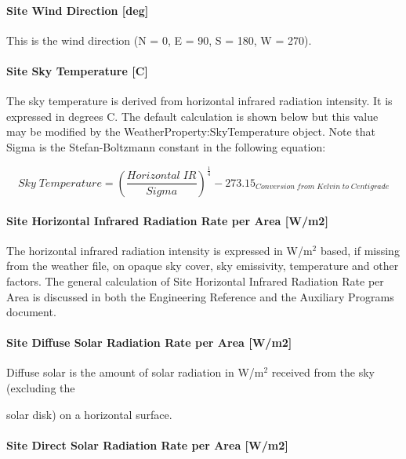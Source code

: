 \paragraph{Site Wind Direction {[}deg{]}}\label{site-wind-direction-deg}

This is the wind direction (N = 0, E = 90, S = 180, W = 270).

\paragraph{Site Sky Temperature {[}C{]}}\label{site-sky-temperature-c}

The sky temperature is derived from horizontal infrared radiation intensity. It is expressed in degrees C. The default calculation is shown below but this value may be modified by the WeatherProperty:SkyTemperature object. Note that Sigma is the Stefan-Boltzmann constant in the following equation:

\begin{equation}
Sky\;Temperature = {\left( {\frac{{Horizontal\;IR}}{{Sigma}}} \right)^{\frac{1}{4}}} - {273.15_{Conversion\;from\;Kelvin\;to\;Centigrade}}
\end{equation}

\paragraph{Site Horizontal Infrared Radiation Rate per Area {[}W/m2{]}}\label{site-horizontal-infrared-radiation-rate-per-area-wm2}

The horizontal infrared radiation intensity is expressed in W/m\(^{2}\) based, if missing from the weather file, on opaque sky cover, sky emissivity, temperature and other factors. The general calculation of Site Horizontal Infrared Radiation Rate per Area is discussed in both the Engineering Reference and the Auxiliary Programs document.

\paragraph{Site Diffuse Solar Radiation Rate per Area {[}W/m2{]}}\label{site-diffuse-solar-radiation-rate-per-area-wm2}

Diffuse solar is the amount of solar radiation in W/m\(^{2}\) received from the sky (excluding the

solar disk) on a horizontal surface.

\paragraph{Site Direct Solar Radiation Rate per Area {[}W/m2{]}}\label{site-direct-solar-radiation-rate-per-area-wm2}

